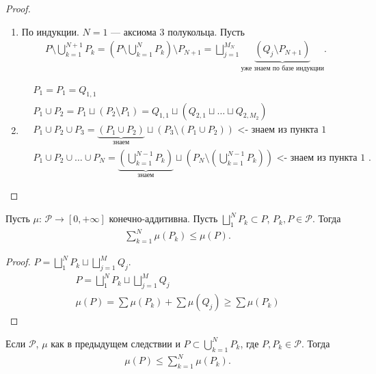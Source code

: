 \begin{proof}\
 \begin{enumerate}
  \item По индукции. $ N = 1$ --- аксиома 3 полукольца. Пусть
   \begin{align*}
    P \setminus \bigcup_{k=1}^{N+1} P_k = \left( P \setminus \bigcup_{k=1}^N P_k \right) \setminus P_{N+1} =  \bigsqcup_{j=1}^{M_N} \underbrace{\left( Q_j \setminus P_{N+1} \right)}_{\text{уже знаем по базе индукции}}
   .\end{align*}
   \item
    \begin{align*}
     &P_1 = P_1 = Q_{1,1} \\
     &P_1 \cup P_2 = P_1 \sqcup (P_2 \setminus P_1) = Q_{1,1} \sqcup (Q_{2,1} \sqcup \ldots \sqcup Q_{2, M_2}) \\
     &P_1 \cup P_2 \cup P_3 = \underbrace{(P_1 \cup P_2)}_{\text{ знаем }} \sqcup (P_3 \setminus (P_1 \cup P_2)) \text{ <- знаем из пункта 1 } \\
     &P_1 \cup P_2 \cup \dots \cup P_N = \underbrace{(\bigcup_{k = 1}^{N - 1} P_k)}_{\text{ знаем }} \sqcup (P_N \setminus (\bigcup_{k = 1}^{N - 1} P_k)) \text{ <- знаем из пункта 1 }
    .\end{align*}
 \end{enumerate}
\end{proof}
\begin{crly}
 Пусть $ \mu \colon\, \mathcal{P} \rightarrow [0, +\infty]$ конечно-аддитивна. Пусть $ \bigsqcup_1^N P_k \subset P $, $ P_k, P \in \mathcal{P} $. Тогда
 \begin{align*}
  \sum_{k=1}^{N}  \mu(P_k) \leqslant \mu(P)
 .\end{align*}
\end{crly}
\begin{proof}
 $ P = \bigsqcup_1^N P_k \sqcup \bigsqcup_{j=1}^M Q_j $.
 \begin{align*}
   P = \bigsqcup_1^N P_k \sqcup \bigsqcup_{j=1}^M Q_j \\
   \mu(P) = \sum \mu(P_k) + \sum \mu(Q_j) \geqslant \sum \mu(P_k)
 \end{align*}
\end{proof}
\begin{crly}
 Если $ \mathcal{P} $, $ \mu $ как в предыдущем следствии и $ P \subset \bigcup_{k=1}^N P_k $, где $ P, P_k \in \mathcal{P} $. Тогда
 \begin{align*}
  \mu(P) \leqslant \sum_{k=1}^N \mu(P_k)
 .\end{align*}
\end{crly}
